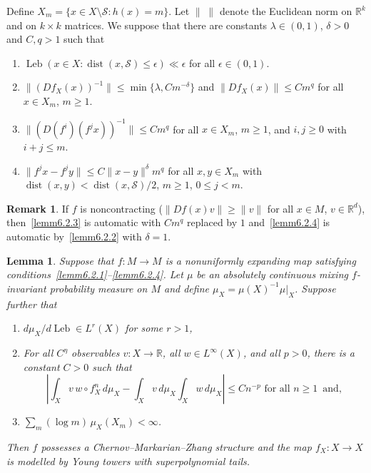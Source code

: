 \documentclass[10pt]{amsart}
\newtheorem{lemm}[theo]{Lemma}\newtheorem{prop}[theo]{Proposition}\newtheorem{coro}[theo]{Corollary}\newtheorem{conj}[theo]{Conjecture}
\theoremstyle{definition}\newtheorem{defi}[theo]{Definition}\newtheorem{rema}[theo]{Remark}\newtheorem{exam}[theo]{Example}\newtheorem{exem}[theo]{Example}\newtheorem{nota}[theo]{Notation}
\newcommand{\R}{\mathbb{R}}
\newcommand{\cS}{\mathcal{S}}
\DeclareMathOperator{\Leb}{Leb}
\DeclareMathOperator{\dist}{dist}
\newcommand{\eps}{\epsilon}
\newcommand*{\romanenumi}{\renewcommand*{\theenumi}{\roman{enumi}}}
\begin{document}
Define $X_m=\{x\in X\setminus\cS:h(x)=m\}$. Let $\|\;\|$ denote the Euclidean norm on $\R^k$ and on $k\times k$ matrices. We suppose that there are constants $\lambda\in(0,1)$, $\delta>0$ and $C,q>1$ such that
\begin{enumerate}\romanenumi
\item \label{lemm6.2.1}$\Leb(x\in X:\dist(x,\cS)\le\eps)\ll \eps$ for all $\eps\in(0,1)$.
\item \label{lemm6.2.2}$\|(Df_X(x))^{-1}\|\le\min\{\lambda,Cm^{-\delta}\}$ and $\|Df_X(x)\|\le Cm^q$ for all $x\in X_m$, $m\ge1$.
\item \label{lemm6.2.3}$\|(D(f^i)(f^jx))^{-1}\|\le Cm^q$ for all $x\in X_m$, $m\ge1$, and $i,j\ge0$ with $i+j\le m$.
\item \label{lemm6.2.4}$\|f^jx-f^jy\|\le C\|x-y\|^\delta m^q$ for all $x,y\in X_m$ with $\dist(x,y)<\dist(x,\cS)/2$, $m\ge1$, $0\le j<m$.
\end{enumerate}

\begin{rema}\label{rmk:NUE}
If $f$ is noncontracting ($\|Df(x)v\|\ge\|v\|$ for all $x\in M$, $v\in\R^d$), then~\eqref{lemm6.2.3} is automatic with $Cm^q$ replaced by $1$ and~\eqref{lemm6.2.4} is automatic by~\eqref{lemm6.2.2} with $\delta=1$.
\end{rema}

\begin{lemm}\label{lem:NUE}
Suppose that $f:M\to M$ is a nonuniformly expanding map satisfying conditions~\eqref{lemm6.2.1}--\eqref{lemm6.2.4}. Let $\mu$ be an absolutely continuous mixing $f$-invariant probability measure on $M$ and define $\mu_X=\mu(X)^{-1}\mu|_X$. Suppose further that
\begin{enumerate}\romanenumi
\setcounter{enumi}{4}
\item \label{lemm6.2.5}$d\mu_X/d\Leb\in L^r(X)$ for some $r>1$,
\item \label{lemm6.2.6}For all $C^\eta$ observables $v:X\to\R$, all $w\in L^\infty(X)$, and all $p>0$, there is a constant $C>0$ such that
\[
\left|\int_X v\,w\circ f_X^n\,d\mu_X-\int_X v\,d\mu_X\int_X w\,d\mu_X\right|\le Cn^{-p}\text{ for all }n\ge1\,\text{ and},
\]

\item \label{lemm6.2.7}$\sum_m (\log m)\,\mu_X(X_m)<\infty$.
\end{enumerate}

Then $f$ possesses a Chernov--Markarian--Zhang structure and the map $f_X:X\to X$ is modelled by Young towers with superpolynomial tails.
\end{lemm}
\end{document}
